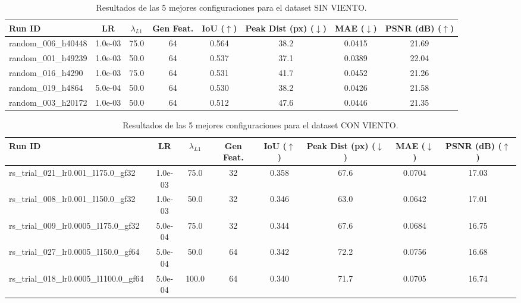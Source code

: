 
\begin{table}[h]
    \centering
    \small
    \caption{Resultados de las 5 mejores configuraciones para el dataset SIN VIENTO.}
    \label{tab:hpt_no_wind}
    \begin{tabular}{l c c c | c c c c}
        \hline
        Run ID & LR & $\lambda_{L1}$ & Gen Feat. & IoU ($\uparrow$) & Peak Dist (px) ($\downarrow$) & MAE ($\downarrow$) & PSNR (dB) ($\uparrow$) \\
        \hline
        random\_006\_h40448 & 1.0e-03 & 75.0 & 64 & 0.564 & 38.2 & 0.0415 & 21.69 \\
random\_001\_h49239 & 1.0e-03 & 50.0 & 64 & 0.537 & 37.1 & 0.0389 & 22.04 \\
random\_016\_h4290 & 1.0e-03 & 75.0 & 64 & 0.531 & 41.7 & 0.0452 & 21.26 \\
random\_019\_h4864 & 5.0e-04 & 50.0 & 64 & 0.530 & 38.2 & 0.0426 & 21.58 \\
random\_003\_h20172 & 1.0e-03 & 50.0 & 64 & 0.512 & 47.6 & 0.0446 & 21.35 \\
        \hline
    \end{tabular}
\end{table}


\begin{table}[h]
    \centering
    \small
    \caption{Resultados de las 5 mejores configuraciones para el dataset CON VIENTO.}
    \label{tab:hpt_with_wind}
    \begin{tabular}{l c c c | c c c c}
        \hline
        Run ID & LR & $\lambda_{L1}$ & Gen Feat. & IoU ($\uparrow$) & Peak Dist (px) ($\downarrow$) & MAE ($\downarrow$) & PSNR (dB) ($\uparrow$) \\
        \hline
        rs\_trial\_021\_lr0.001\_l175.0\_gf32 & 1.0e-03 & 75.0 & 32 & 0.358 & 67.6 & 0.0704 & 17.03 \\
rs\_trial\_008\_lr0.001\_l150.0\_gf32 & 1.0e-03 & 50.0 & 32 & 0.346 & 63.0 & 0.0642 & 17.01 \\
rs\_trial\_009\_lr0.0005\_l175.0\_gf32 & 5.0e-04 & 75.0 & 32 & 0.344 & 67.6 & 0.0684 & 16.75 \\
rs\_trial\_027\_lr0.0005\_l150.0\_gf64 & 5.0e-04 & 50.0 & 64 & 0.342 & 72.2 & 0.0756 & 16.68 \\
rs\_trial\_018\_lr0.0005\_l1100.0\_gf64 & 5.0e-04 & 100.0 & 64 & 0.340 & 71.7 & 0.0705 & 16.74 \\
        \hline
    \end{tabular}
\end{table}


